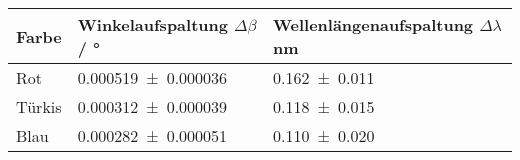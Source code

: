 \begin{tabular}{lll}
	\toprule
	Farbe & Winkelaufspaltung $\Delta\beta$ / \si{\degree} & Wellenlängenaufspaltung $\Delta\lambda$ \si{\nano\metre}  \\
	\midrule
	Rot  &	\num{0.000519+-0.000036} &	\num{0.162+-0.011} \\
	Türkis  &	\num{0.000312+-0.000039} &	\num{0.118+-0.015} \\
	Blau  &	\num{0.000282+-0.000051} &	\num{0.110+-0.020} \\
	\bottomrule
\end{tabular}